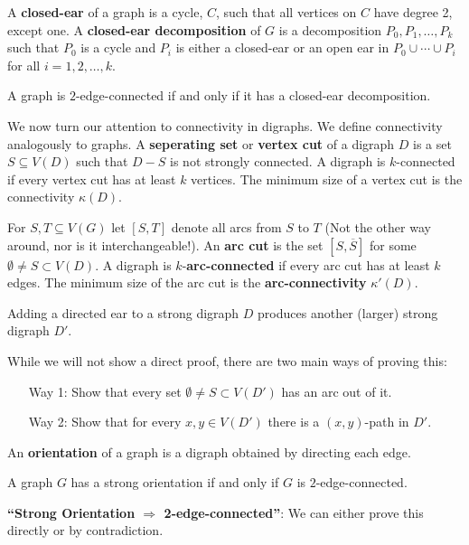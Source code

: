 A \textbf{closed-ear} of a graph is a cycle, $C$, such that all vertices on $C$ have degree 2, except one. A \textbf{closed-ear decomposition} of $G$ is a decomposition $P_{0},P_{1}, \ldots, P_k$ such that $P_{0}$ is a cycle and $P_{i}$ is either a closed-ear or an open ear in $P_{0} \cup \cdots \cup P_{i}$ for all $i = 1, 2, \ldots, k$.

\begin{theorem}
	A graph is $2$-edge-connected if and only if it has a closed-ear decomposition.
\end{theorem}

We now turn our attention to connectivity in digraphs. We define connectivity analogously to graphs. A \textbf{seperating set} or \textbf{vertex cut} of a digraph $D$ is a set $S \subseteq V(D)$ such that $D-S$ is not strongly connected. A digraph is $k$-connected if every vertex cut has at least $k$ vertices. The minimum size of a vertex cut is the connectivity \(\kappa(D)\).

For $S, T \subseteq V(G)$ let $[S, T]$ denote all arcs from $S$ to $T$ (Not the other way around, nor is it interchangeable!). An \textbf{arc cut} is the set $[S, \overline{S}]$ for some $\emptyset \ne S \subset V(D)$. A digraph is $k$-\textbf{arc-connected} if every arc cut has at least $k$ edges. The minimum size of the arc cut is the \textbf{arc-connectivity} \(\kappa'(D)\).

\begin{proposition}
	Adding a directed ear to a strong digraph $D$ produces another (larger) strong digraph $D'$.
\end{proposition}

While we will not show a direct proof, there are two main ways of proving this:
\begin{enumerate}
	\item[Way 1: ] Show that every set $\emptyset \ne S \subset V(D')$ has an arc out of it.
	\item[Way 2: ] Show that for every $x,y \in V(D')$ there is a $(x,y)$-path in $D'$.
\end{enumerate}

An \textbf{orientation} of a graph is a digraph obtained by directing each edge.

\begin{theorem}
	A graph $G$ has a strong orientation if and only if $G$ is $2$-edge-connected.
\end{theorem}

\textbf{``Strong Orientation \(\Rightarrow\) 2-edge-connected''}: We can either prove this directly or by contradiction.

